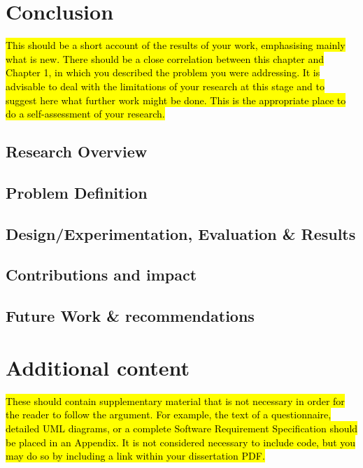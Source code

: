 \documentclass[oneside,12pt]{book}
\begin{document}
\chapter{Conclusion}
\hl{This should be a short account of the results of your work, emphasising mainly what is new. There should be a close correlation between this chapter and Chapter 1, in which you described the problem you were addressing. It is advisable to deal with the limitations of your research at this stage and to suggest here what further work might be done. This is the appropriate place to do a self-assessment of your research.}

\section{Research Overview}

\section{Problem Definition}

\section{Design/Experimentation, Evaluation \& Results}

\section{Contributions and impact}

\section{Future Work \& recommendations}





\appendix
\chapter{Additional content}
\hl{These should contain supplementary material that is not necessary in order for the reader to follow the argument. For example, the text of a questionnaire, detailed UML diagrams, or a complete Software Requirement Specification should be placed in an Appendix. It is not considered necessary to include code, but you may do so by including a link within your dissertation PDF.}
\end{document}
